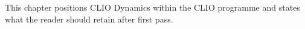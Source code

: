 This chapter positions CLIO Dynamics within the CLIO programme and states what the reader should retain after first pass.
